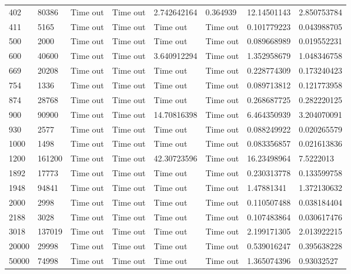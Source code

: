 \begin{landscape}
\begin{longtabu} {|l|l|l|l|l|l|l|l|}
402       & 80386   & Time out & Time out & 2.742642164    & 0.364939 & 12.14501143 & 2.850753784 \\
411       & 5165    & Time out & Time out & Time out       & Time out & 0.101779223 & 0.043988705 \\
500       & 2000    & Time out & Time out & Time out       & Time out & 0.089668989 & 0.019552231 \\
600       & 40600   & Time out & Time out & 3.640912294    & Time out & 1.352958679 & 1.048346758 \\
669       & 20208   & Time out & Time out & Time out       & Time out & 0.228774309 & 0.173240423 \\
754       & 1336    & Time out & Time out & Time out       & Time out & 0.089713812 & 0.121773958 \\
874       & 28768   & Time out & Time out & Time out       & Time out & 0.268687725 & 0.282220125 \\
900       & 90900   & Time out & Time out & 14.70816398    & Time out & 6.464350939 & 3.204070091 \\
930       & 2577    & Time out & Time out & Time out       & Time out & 0.088249922 & 0.020265579 \\
1000      & 1498    & Time out & Time out & Time out       & Time out & 0.083356857 & 0.021613836 \\
1200      & 161200  & Time out & Time out & 42.30723596    & Time out & 16.23498964 & 7.5222013   \\
1892      & 17773   & Time out & Time out & Time out       & Time out & 0.230313778 & 0.133599758 \\
1948      & 94841   & Time out & Time out & Time out       & Time out & 1.47881341  & 1.372130632 \\
2000      & 2998    & Time out & Time out & Time out       & Time out & 0.110507488 & 0.038184404 \\
2188      & 3028    & Time out & Time out & Time out       & Time out & 0.107483864 & 0.030617476 \\
3018      & 137019  & Time out & Time out & Time out       & Time out & 2.199171305 & 2.013922215 \\
20000     & 29998   & Time out & Time out & Time out       & Time out & 0.539016247 & 0.395638228 \\
50000     & 74998   & Time out & Time out & Time out       & Time out & 1.365074396 & 0.93032527  \\ \bottomrule
\end{longtabu}
\end{landscape}